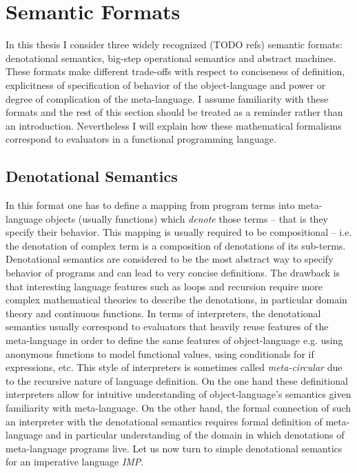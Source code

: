 \section{Semantic Formats}
In this thesis I consider three widely recognized (TODO refs) semantic formats: denotational semantics, big-step operational semantics and abstract machines.
These formats make different trade-offs with respect to conciseness of definition, explicitness of specification of behavior of the object-language and power or degree of complication of the meta-language.
I assume familiarity with these formats and the rest of this section should be treated as a reminder rather than an introduction.
Nevertheless I will explain how these mathematical formalisms correspond to evaluators in a functional programming language.

\subsection*{Denotational Semantics}
In this format one has to define a mapping from program terms into meta-language objects (usually functions) which \emph{denote} those terms -- that is they specify their behavior.
This mapping is usually required to be compositional -- i.e. the denotation of complex term is a composition of denotations of its sub-terms.
Denotational semantics are considered to be the most abstract way to specify behavior of programs and can lead to very concise definitions.
The drawback is that interesting language features such as loops and recursion require more complex mathematical theories to describe the denotations, in particular domain theory and continuous functions.
In terms of interpreters, the denotational semantics usually correspond to evaluators that heavily reuse features of the meta-language in order to define the same features of object-language e.g. using anonymous functions to model functional values, using conditionals for if expressions, etc.
This style of interpreters is sometimes called \textit{meta-circular} due to the recursive nature of language definition.
On the one hand these definitional interpreters allow for intuitive understanding of object-language's semantics given familiarity with meta-language.
On the other hand, the formal connection of such an interpreter with the denotational semantics requires formal definition of meta-language and in particular understanding of the domain in which denotations of meta-language programs live.
Let us now turn to simple denotational semantics for an imperative language \textit{IMP}.

